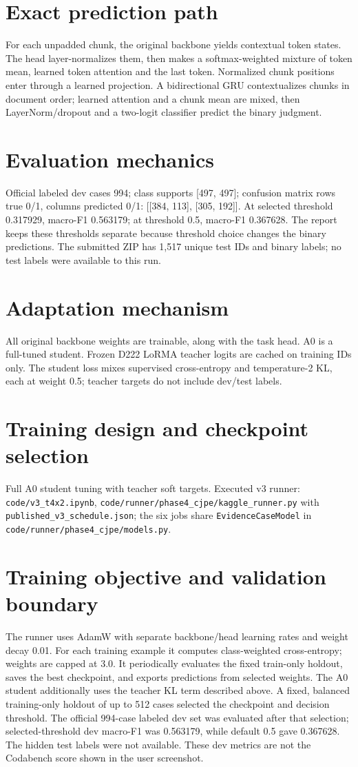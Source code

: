 \documentclass[11pt,a4paper]{article}
\begin{document}
\section{Exact prediction path}
For each unpadded chunk, the original backbone yields contextual token states. The head layer-normalizes them, then makes a softmax-weighted mixture of token mean, learned token attention and the last token. Normalized chunk positions enter through a learned projection. A bidirectional GRU contextualizes chunks in document order; learned attention and a chunk mean are mixed, then LayerNorm/dropout and a two-logit classifier predict the binary judgment.
\section{Evaluation mechanics}
Official labeled dev cases 994; class supports [497, 497]; confusion matrix rows true 0/1, columns predicted 0/1: [[384, 113], [305, 192]]. At selected threshold 0.317929, macro-F1 0.563179; at threshold 0.5, macro-F1 0.367628. The report keeps these thresholds separate because threshold choice changes the binary predictions. The submitted ZIP has 1,517 unique test IDs and binary labels; no test labels were available to this run.
\section{Adaptation mechanism}
All original backbone weights are trainable, along with the task head. A0 is a full-tuned student. Frozen D222 LoRMA teacher logits are cached on training IDs only. The student loss mixes supervised cross-entropy and temperature-2 KL, each at weight 0.5; teacher targets do not include dev/test labels.
\section{Training design and checkpoint selection}
Full A0 student tuning with teacher soft targets. Executed v3 runner: \texttt{code/v3\_t4x2.ipynb}, \texttt{code/runner/phase4\_cjpe/kaggle\_runner.py} with \texttt{published\_v3\_schedule.json}; the six jobs share \texttt{EvidenceCaseModel} in \texttt{code/runner/phase4\_cjpe/models.py}.
\section{Training objective and validation boundary}
The runner uses AdamW with separate backbone/head learning rates and weight decay 0.01. For each training example it computes class-weighted cross-entropy; weights are capped at 3.0. It periodically evaluates the fixed train-only holdout, saves the best checkpoint, and exports predictions from selected weights. The A0 student additionally uses the teacher KL term described above. A fixed, balanced training-only holdout of up to 512 cases selected the checkpoint and decision threshold. The official 994-case labeled dev set was evaluated after that selection; selected-threshold dev macro-F1 was 0.563179, while default 0.5 gave 0.367628. The hidden test labels were not available. These dev metrics are not the Codabench score shown in the user screenshot.
\end{document}
